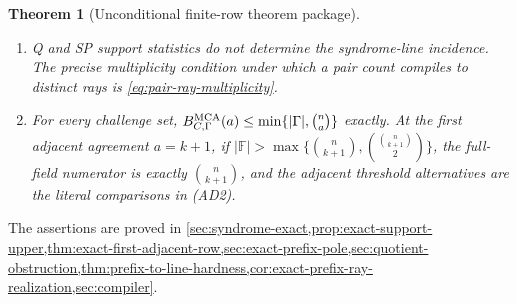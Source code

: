 \documentclass[12pt,a4paper]{amsart}
\numberwithin{equation}{section}
\newtheorem{theorem}{Theorem}[section]
\theoremstyle{remark}
\newcommand{\F}{\mathbb F}
\newcommand{\abs}[1]{\lvert #1\rvert}
\begin{document}
\begin{theorem}[Unconditional finite-row theorem package]
\begin{enumerate}[label=\textup{(\roman*)},leftmargin=*]
      complete-fiber-plus-remainder prefix with remainder degree \(r<c\)
      has the exact finite-row normal form of
      \cref{thm:exact-quotient-remainder-normal-form}.  Along every
      sequence satisfying \cref{prop:identity-quotient-comparison}, fixed
      \(c,r\) give the field-sensitive identity-crossing exponent
      \eqref{eq:qr-comparison-crossing}.
\item Q and SP support statistics do not determine the syndrome-line
      incidence.  The precise multiplicity condition under which a pair
      count compiles to distinct rays is
      \eqref{eq:pair-ray-multiplicity}.
\item For every challenge set,
      \(B_{C,\Gamma}^{\rm MCA}(a)\le
      \min\{\abs\Gamma,\binom na\}\) exactly.  At the first adjacent
      agreement \(a=k+1\), if
      \(\abs\F>\max\{\binom n{k+1},
      \binom{\binom n{k+1}}2\}\), the full-field numerator is
      exactly \(\binom n{k+1}\), and the adjacent threshold alternatives
      are the literal comparisons in \textup{(AD2)}.
\end{enumerate}
\end{theorem}

The assertions are proved in
\cref{sec:syndrome-exact,prop:exact-support-upper,thm:exact-first-adjacent-row,sec:exact-prefix-pole,sec:quotient-obstruction,thm:prefix-to-line-hardness,cor:exact-prefix-ray-realization,sec:compiler}.
\end{document}
